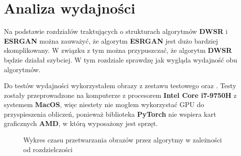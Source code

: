 \section{Analiza wydajności}

Na podstawie rozdziałów traktujących o strukturach algorytmów \textbf{DWSR} i \textbf{ESRGAN} można zauważyć, że algorytm \textbf{ESRGAN} jest dużo bardziej skomplikowany. W związku z tym można przypuszczać, że algorytm \textbf{DWSR} będzie działał szybciej. W tym rozdziale sprawdzę jak wygląda wydajność obu algorytmów.

Do testów wydajności wykorzystałem obrazy z zestawu testowego \cite{guo2017deep} oraz \cite{zeyde2010single}. Testy zostały przeprowadzone na komputerze z procesorem \textbf{Intel Core i7-9750H} z systemem \textbf{MacOS}, więc niestety nie mogłem wykorzystać GPU do przyspieszenia obliczeń, ponieważ biblioteka \textbf{PyTorch} nie wspiera kart graficznych \textbf{AMD}, w którą wyposażony jest sprzęt.

\begin{figure}[H]
    \centering

    \caption{Wykres czasu przetwarzania obrazów przez algorytmy w zależności od rozdzielczości}
    \label{fig:time_chart}
\end{figure}


